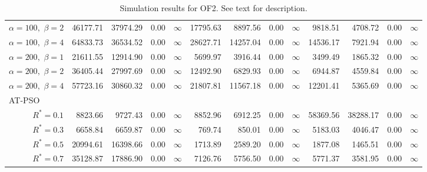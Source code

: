 \documentclass[12pt]{article}
\begin{document}
\begin{table}[ht]
{\begin{tabular}{r|rrrr|rrrr|rrrr}
  $\alpha = 100,$ $\beta =2$ & 46177.71 & 37974.29 & 0.00 & $\infty$ & 17795.63 & 8897.56 & 0.00 & $\infty$ & 9818.51 & 4708.72 & 0.00 & $\infty$ \\ 
  $\alpha = 100,$ $\beta =4$ & 64833.73 & 36534.52 & 0.00 & $\infty$ & 28627.71 & 14257.04 & 0.00 & $\infty$ & 14536.17 & 7921.94 & 0.00 & $\infty$ \\ 
  $\alpha = 200,$ $\beta =1$ & 21611.55 & 12914.90 & 0.00 & $\infty$ & 5699.97 & 3916.44 & 0.00 & $\infty$ & 3499.49 & 1865.32 & 0.00 & $\infty$ \\ 
  $\alpha = 200,$ $\beta =2$ & 36405.44 & 27997.69 & 0.00 & $\infty$ & 12492.90 & 6829.93 & 0.00 & $\infty$ & 6944.87 & 4559.84 & 0.00 & $\infty$ \\ 
  $\alpha = 200,$ $\beta =4$ & 57723.16 & 30860.32 & 0.00 & $\infty$ & 21807.81 & 11567.18 & 0.00 & $\infty$ & 12201.41 & 5365.69 & 0.00 & $\infty$ \\ 
\hline
\multicolumn{1}{l|}{AT-PSO} &&&&&&&&&&&&\\
  $R^* = 0.1$ & 8823.66 & 9727.43 & 0.00 & $\infty$ & 8852.96 & 6912.25 & 0.00 & $\infty$ & 58369.56 & 38288.17 & 0.00 & $\infty$ \\ 
  $R^* = 0.3$ & 6658.84 & 6659.87 & 0.00 & $\infty$ & 769.74 & 850.01 & 0.00 & $\infty$ & 5183.03 & 4046.47 & 0.00 & $\infty$ \\ 
  $R^* = 0.5$ & 20994.61 & 16398.66 & 0.00 & $\infty$ & 1713.89 & 2589.20 & 0.00 & $\infty$ & 1877.08 & 1465.51 & 0.00 & $\infty$ \\ 
  $R^* = 0.7$ & 35128.87 & 17886.90 & 0.00 & $\infty$ & 7126.76 & 5756.50 & 0.00 & $\infty$ & 5771.37 & 3581.95 & 0.00 & $\infty$ \\ 
   \hline
\end{tabular}
}
\caption{Simulation results for OF2. See text for description.}
\label{tab:psosim2}
\end{table}
\end{document}
